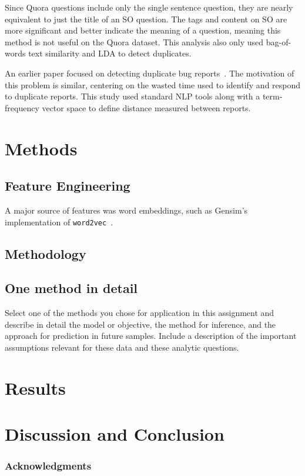 \documentclass{article} %
\begin{document}
Since Quora questions include only the single sentence question, they are nearly equivalent to just the title of an SO question. The tags and content on SO are more significant and better indicate the meaning of a question, meaning this method is not useful on the Quora dataset. This analysis also only used bag-of-words text similarity and LDA to detect duplicates.

An earlier paper focused on detecting duplicate bug reports~\cite{Runeson2007}. The motivation of this problem is similar, centering on the wasted time used to identify and respond to duplicate reports. This study used standard NLP tools along with a term-frequency vector space to define distance measured between reports. 

\section{Methods}

\subsection{Feature Engineering}

A major source of features was word embeddings, such as Gensim's implementation of \texttt{word2vec}~\cite{gensim}.

\subsection{Methodology}

\subsection{One method in detail}

Select one of the methods you chose for application in this assignment and describe in detail the model or objective, the method for inference, and the approach for prediction in future samples. Include a description of the important assumptions relevant for these data and these analytic questions.

\section{Results}

\section{Discussion and Conclusion}

\subsubsection*{Acknowledgments}


\printbibliography
\end{document}
